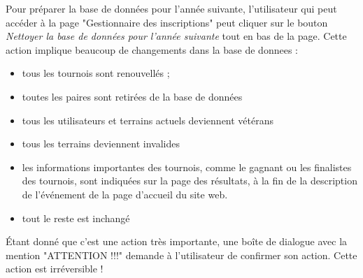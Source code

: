 Pour préparer la base de données pour l'année suivante, l'utilisateur qui peut accéder à la page "Gestionnaire des inscriptions" peut cliquer sur le bouton \textit{Nettoyer la base de données pour l'année suivante} tout en bas de la page. Cette action implique beaucoup de changements dans la base de donnees :

\begin{itemize}
\item tous les tournois sont renouvellés ;
\item toutes les paires sont retirées de la base de données
\item tous les utilisateurs et terrains actuels deviennent vétérans
\item tous les terrains deviennent invalides
\item les informations importantes des tournois, comme le gagnant ou les finalistes des tournois, sont indiquées sur la page des résultats, à la fin de la description de l'événement de la page d'accueil du site web.
\item tout le reste est inchangé
\end{itemize}
\bigskip

Étant donné que c'est une action très importante, une boîte de dialogue avec la mention "ATTENTION !!!" demande à l'utilisateur de confirmer son action. Cette action est irréversible !